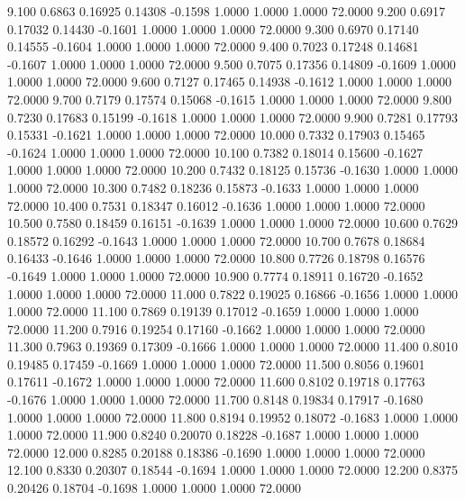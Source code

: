    9.100   0.6863   0.16925   0.14308  -0.1598   1.0000   1.0000   1.0000  72.0000
   9.200   0.6917   0.17032   0.14430  -0.1601   1.0000   1.0000   1.0000  72.0000
   9.300   0.6970   0.17140   0.14555  -0.1604   1.0000   1.0000   1.0000  72.0000
   9.400   0.7023   0.17248   0.14681  -0.1607   1.0000   1.0000   1.0000  72.0000
   9.500   0.7075   0.17356   0.14809  -0.1609   1.0000   1.0000   1.0000  72.0000
   9.600   0.7127   0.17465   0.14938  -0.1612   1.0000   1.0000   1.0000  72.0000
   9.700   0.7179   0.17574   0.15068  -0.1615   1.0000   1.0000   1.0000  72.0000
   9.800   0.7230   0.17683   0.15199  -0.1618   1.0000   1.0000   1.0000  72.0000
   9.900   0.7281   0.17793   0.15331  -0.1621   1.0000   1.0000   1.0000  72.0000
  10.000   0.7332   0.17903   0.15465  -0.1624   1.0000   1.0000   1.0000  72.0000
  10.100   0.7382   0.18014   0.15600  -0.1627   1.0000   1.0000   1.0000  72.0000
  10.200   0.7432   0.18125   0.15736  -0.1630   1.0000   1.0000   1.0000  72.0000
  10.300   0.7482   0.18236   0.15873  -0.1633   1.0000   1.0000   1.0000  72.0000
  10.400   0.7531   0.18347   0.16012  -0.1636   1.0000   1.0000   1.0000  72.0000
  10.500   0.7580   0.18459   0.16151  -0.1639   1.0000   1.0000   1.0000  72.0000
  10.600   0.7629   0.18572   0.16292  -0.1643   1.0000   1.0000   1.0000  72.0000
  10.700   0.7678   0.18684   0.16433  -0.1646   1.0000   1.0000   1.0000  72.0000
  10.800   0.7726   0.18798   0.16576  -0.1649   1.0000   1.0000   1.0000  72.0000
  10.900   0.7774   0.18911   0.16720  -0.1652   1.0000   1.0000   1.0000  72.0000
  11.000   0.7822   0.19025   0.16866  -0.1656   1.0000   1.0000   1.0000  72.0000
  11.100   0.7869   0.19139   0.17012  -0.1659   1.0000   1.0000   1.0000  72.0000
  11.200   0.7916   0.19254   0.17160  -0.1662   1.0000   1.0000   1.0000  72.0000
  11.300   0.7963   0.19369   0.17309  -0.1666   1.0000   1.0000   1.0000  72.0000
  11.400   0.8010   0.19485   0.17459  -0.1669   1.0000   1.0000   1.0000  72.0000
  11.500   0.8056   0.19601   0.17611  -0.1672   1.0000   1.0000   1.0000  72.0000
  11.600   0.8102   0.19718   0.17763  -0.1676   1.0000   1.0000   1.0000  72.0000
  11.700   0.8148   0.19834   0.17917  -0.1680   1.0000   1.0000   1.0000  72.0000
  11.800   0.8194   0.19952   0.18072  -0.1683   1.0000   1.0000   1.0000  72.0000
  11.900   0.8240   0.20070   0.18228  -0.1687   1.0000   1.0000   1.0000  72.0000
  12.000   0.8285   0.20188   0.18386  -0.1690   1.0000   1.0000   1.0000  72.0000
  12.100   0.8330   0.20307   0.18544  -0.1694   1.0000   1.0000   1.0000  72.0000
  12.200   0.8375   0.20426   0.18704  -0.1698   1.0000   1.0000   1.0000  72.0000
